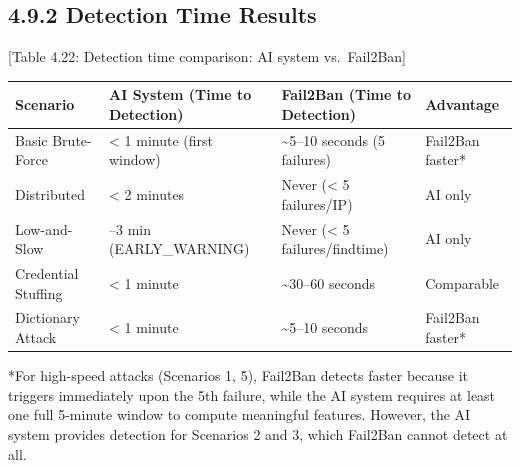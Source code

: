 \documentclass[
  a4paper]{report}
\newcounter{none} %
\begin{document}
\subsection{4.9.2 Detection Time Results}\label{detection-time-results}

{[}Table 4.22: Detection time comparison: AI system vs.~Fail2Ban{]}

{\def\LTcaptype{none} %
\begin{longtable}[]{@{}
  >{\raggedright\arraybackslash}p{}
  >{\raggedright\arraybackslash}p{}
  >{\raggedright\arraybackslash}p{}
  >{\raggedright\arraybackslash}p{}@{}}
\toprule\noalign{}
\begin{minipage}[b]{\linewidth}\raggedright
Scenario
\end{minipage} & \begin{minipage}[b]{\linewidth}\raggedright
AI System (Time to Detection)
\end{minipage} & \begin{minipage}[b]{\linewidth}\raggedright
Fail2Ban (Time to Detection)
\end{minipage} & \begin{minipage}[b]{\linewidth}\raggedright
Advantage
\end{minipage} \\
\midrule\noalign{}
\endhead
\bottomrule\noalign{}
\endlastfoot
Basic Brute-Force & \textless{} 1 minute (first window) &
\textasciitilde5--10 seconds (5 failures) & Fail2Ban faster* \\
Distributed & \textless{} 2 minutes & Never (\textless{} 5 failures/IP)
& AI only \\
Low-and-Slow & 2--3 min (EARLY\_WARNING) & Never (\textless{} 5
failures/findtime) & AI only \\
Credential Stuffing & \textless{} 1 minute & \textasciitilde30--60
seconds & Comparable \\
Dictionary Attack & \textless{} 1 minute & \textasciitilde5--10 seconds
& Fail2Ban faster* \\
\end{longtable}
}

*For high-speed attacks (Scenarios 1, 5), Fail2Ban detects faster
because it triggers immediately upon the 5th failure, while the AI
system requires at least one full 5-minute window to compute meaningful
features. However, the AI system provides detection for Scenarios 2 and
3, which Fail2Ban cannot detect at all.
\end{document}

